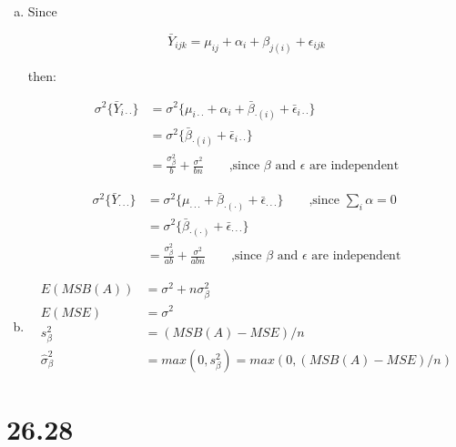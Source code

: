 \documentclass{article}\usepackage[]{graphicx}\usepackage[]{color}
\begin{document}
\begin{enumerate}[(a)]

\item

Since

$$\bar{Y}_{ijk} = \mu_{ij} + \alpha_i + \beta_{j (i)} + \epsilon_{ijk}$$

then:

\begin{displaymath}
\begin{split}
\sigma^2 \{ \bar{Y}_{i\cdot\cdot} \} &= \sigma^2 \{ \mu_{i\cdot\cdot} + \alpha_i + \bar{\beta}_{\cdot (i)} + \bar{\epsilon}_{i\cdot\cdot} \} \\
                        &= \sigma^2 \{ \bar{\beta}_{\cdot (i)} + \bar{\epsilon}_{i\cdot\cdot} \} \\
                        &= \frac{\sigma^2_{\beta}}{b} + \frac{\sigma^2}{bn}  \qquad \text{,since $\beta$ and $\epsilon$ are independent}
\end{split}
\end{displaymath}

\begin{displaymath}
\begin{split}
\sigma^2 \{ \bar{Y}_{\cdot\cdot\cdot} \} &= \sigma^2 \{ \mu_{\cdot\cdot\cdot}  + \bar{\beta}_{\cdot (\cdot)} + \bar{\epsilon}_{\cdot\cdot\cdot} \} \qquad \text{,since $\sum_i \alpha=0$}\\
                        &= \sigma^2 \{ \bar{\beta}_{\cdot (\cdot)} + \bar{\epsilon}_{\cdot\cdot\cdot} \} \\
                        &= \frac{\sigma^2_{\beta}}{ab} + \frac{\sigma^2}{abn}  \qquad \text{,since $\beta$ and $\epsilon$ are independent}
\end{split}
\end{displaymath}

\item

\begin{displaymath}
\begin{split}
E(MSB(A)) &= \sigma^2 + n\sigma^2_{\beta}\\
E(MSE) &= \sigma^2 \\
s^2_\beta &= (MSB(A)-MSE)/n\\
\hat{\sigma}_\beta^2 &= max(0, s^2_\beta) = max(0, (MSB(A)-MSE)/n)
\end{split}
\end{displaymath}

\end{enumerate}

\section{26.28}
\end{document}
